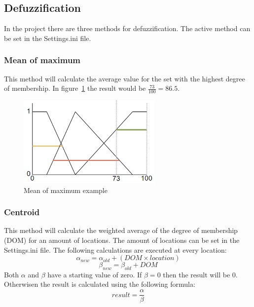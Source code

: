 \documentclass{article}
\begin{document}
   \subsection{Defuzzification}
   In the project there are three methods for defuzzification. The active method can be set in the Settings.ini file.
   
   \subsubsection {Mean of maximum}  
   This method will calculate the average value for the set with the highest degree of membership. In figure~\ref{fig:MOM} the result would be \(\frac{73}{100}=86.5\). 
   \begin{figure}[h!]
   \begin{center}
   \includegraphics[width=7cm]{MOM.png}
   \end{center}
   \caption{Mean of maximum example}
   \label{fig:MOM}
   \end{figure}
   \subsubsection {Centroid}  
   This method will calculate the weighted average of the degree of membership (DOM) for an amount of locations. The amount of locations can be set in the Settings.ini file. The following calculations are executed at every location:
   \[ \alpha_{new} = \alpha_{old} + (DOM \times location) \]
   \[ \beta_{new} = \beta_{old} + DOM \]
   Both \(\alpha\) and \(\beta\) have a starting value of zero. If \(\beta = 0\) then the result will be \(0\). 
   Otherwisen the result is calculated using the following formula:
   \[ result = \frac{\alpha}{\beta} \]
   
\end{document}
